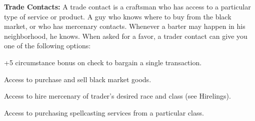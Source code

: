 \textbf{Trade Contacts:} A trade contact is a craftsman who has access to a particular type of service or product. A guy who knows where to buy from the black market, or who has mercenary contacts. Whenever a barter may happen in his neighborhood, he knows. When asked for a favor, a trader contact can give you one of the following options:

\begin{itemize*}
\item +5 circumstance bonus on  check to bargain a single transaction.
\item Access to purchase and sell black market goods.
\item Access to hire mercenary of trader's desired race and class (see Hirelings).
\item Access to purchasing spellcasting services from a particular class.
\end{itemize*}
